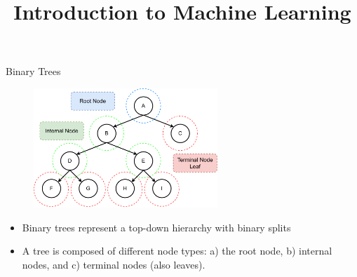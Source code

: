 \documentclass[11pt,compress,t,notes=noshow, xcolor=table]{beamer}
\title{Introduction to Machine Learning}
\begin{document}

\begin{vbframe}{Binary Trees}
    \begin{figure}
    \centering
      \includegraphics[height = 4.5cm, keepaspectratio]{figure/cart_intro_binary-tree_1.pdf}
    \end{figure}
  \begin{itemize}
    \item Binary trees represent a top-down hierarchy with binary splits
    \item A tree is composed of different node types: a) the root node, b) internal nodes, and c) terminal nodes (also leaves).
  \end{itemize}
\end{vbframe}
\end{document}

